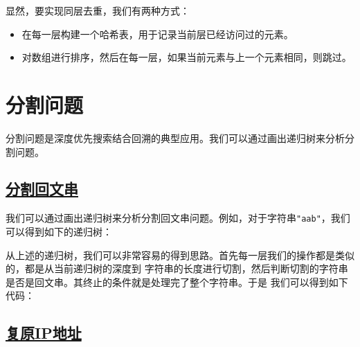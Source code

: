 \documentclass[../../main.tex]{subfiles}
\begin{document}
显然，要实现同层去重，我们有两种方式：

\begin{itemize}
  \item 在每一层构建一个哈希表，用于记录当前层已经访问过的元素。
  \item 对数组进行排序，然后在每一层，如果当前元素与上一个元素相同，则跳过。
\end{itemize}



\section{分割问题}

分割问题是深度优先搜索结合回溯的典型应用。我们可以通过画出递归树来分析分割问题。

\subsection{\href{https://leetcode.cn/problems/palindrome-partitioning/}{分割回文串}}

我们可以通过画出递归树来分析分割回文串问题。例如，对于字符串\texttt{"aab"}，我们可以得到如下的递归树：


从上述的递归树，我们可以非常容易的得到思路。首先每一层我们的操作都是类似的，都是从当前递归树的深度到
字符串的长度进行切割，然后判断切割的字符串是否是回文串。其终止的条件就是处理完了整个字符串。于是
我们可以得到如下代码：



\subsection{\href{https://leetcode.cn/problems/restore-ip-addresses/}{复原IP地址}}
\end{document}
